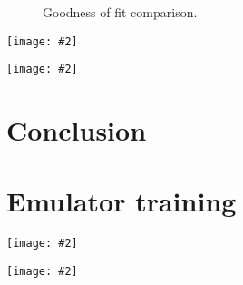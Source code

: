 \documentclass[aps, prc, reprint, amsmath]{revtex4-1}
\newcommand{\widefig}[3][t]{
  \begin{figure*}[#1]
    \texttt{[image: \#2]}
    \caption{\label{fig:#2}#3}
  \end{figure*}
}
\newcommand{\placeholderfig}[3][t]{
  \begin{figure}[#1]
    \centering
    \framebox{\parbox[c][.5\columnwidth]{\columnwidth}{
      placeholder
    }}
    \caption{\label{fig:#2}#3}
  \end{figure}
}
\begin{document}
\placeholderfig{chi_squared}{
  Goodness of fit comparison.
}

\widefig{posterior_draws_glb}{
  Random realizations of the calibrated posterior for the Glauber model.
  Similar to FIG.~\ref{fig:prior_draws_glb},
  except the lines are posterior emulator predictions instead of explicit prior calculations.
  The red line is the maximum a posteriori point of the MCMC chain.
}

\widefig{posterior_draws_kln}{
  Same as FIG.~\ref{fig:posterior_draws_glb} for the KLN model.
}



\section{Conclusion}



\appendix


\section{Emulator training}

\widefig{training_posterior_glb}{
  Posterior distributions of the principal component Gaussian process hyperparameters for the Glauber model.
  The notation $\ell\;x$ means the squared-exponential correlation length for parameter $x$.
}

\widefig{training_posterior_kln}{
  Same as FIG.~\ref{fig:training_posterior_glb} for the KLN model.
}




\end{document}
